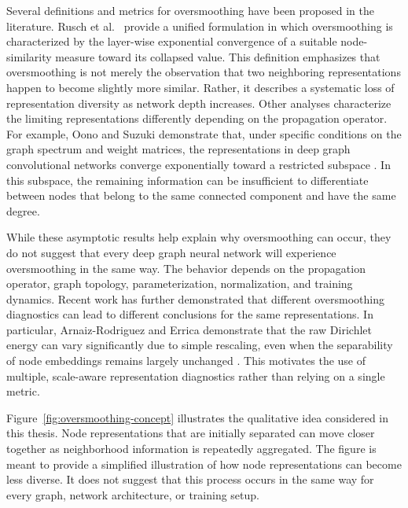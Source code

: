 \documentclass[english]{lni}
\begin{document}
Several definitions and metrics for oversmoothing have been proposed in the literature. Rusch et al.\ \cite{rusch2023oversmoothing} provide a unified formulation in which oversmoothing is characterized by the layer-wise exponential convergence of a suitable node-similarity measure toward its collapsed value. This definition emphasizes that oversmoothing is not merely the observation that two neighboring representations happen to become slightly more similar. Rather, it describes a systematic loss of representation diversity as network depth increases. Other analyses characterize the limiting representations differently depending on the propagation operator. For example, Oono and Suzuki demonstrate that, under specific conditions on the graph spectrum and weight matrices, the representations in deep graph convolutional networks converge exponentially toward a restricted subspace \cite{oono2020oversmoothing}. In this subspace, the remaining information can be insufficient to differentiate between nodes that belong to the same connected component and have the same degree.

While these asymptotic results help explain why oversmoothing can occur, they do not suggest that every deep graph neural network will experience oversmoothing in the same way. The behavior depends on the propagation operator, graph topology, parameterization, normalization, and training dynamics. Recent work has further demonstrated that different oversmoothing diagnostics can lead to different conclusions for the same representations. In particular, Arnaiz-Rodriguez and Errica demonstrate that the raw Dirichlet energy can vary significantly due to simple rescaling, even when the separability of node embeddings remains largely unchanged \cite{arnaiz2026demystifying}. This motivates the use of multiple, scale-aware representation diagnostics rather than relying on a single metric.

Figure~\ref{fig:oversmoothing-concept} illustrates the qualitative idea considered in this thesis. Node representations that are initially separated can move closer together as neighborhood information is repeatedly aggregated. The figure is meant to provide a simplified illustration of how node representations can become less diverse. It does not suggest that this process occurs in the same way for every graph, network architecture, or training setup.
\end{document}
